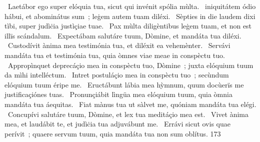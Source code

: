 {~Laetábor ego super elóquia tua, sicut qui invénit spólia mùlta.
~iniquitátem ódio hábui, et abominátus sum~; leġem autem tuam diléxi.
~Sèpties in die laudem dixi tìbi, super judìċia justìçiae tuae.
~Pax mùlta diligèntibus leġem tuam, et non est illïs scándalum.
~Expectábam salutáre tuum, Dòmine, et mandáta tua diléxi.
~Custodívit ànima mea testimónia tua, et diléxit ea vehemènter.
~Servávi mandáta tua et testimónia tua, quia òmnes viae meae in conspèctu tuo.
~Appropìnquet deprecáçio mea in conspèctu tuo, Dòmine~; juxta elóquium tuum da mìhi intelléctum.
~Intret postuláçio mea in conspèctu tuo~; secùndum elóquium tuum éripe me.
~Eructábunt lábia mea hỳmnum, quum docùerïs me justificaçiónes tuas.
~Pronunçiábit lìngüa mea elóquium tuum, quia òmnia mandáta tua áequitas.
~Fiat mànus tua ut sàlvet me, quóniam mandáta tua elégi.
~Concupívi salutáre tuum, Dòmine, et lex tua meditáçio mea est.
~Vivet ànima mea, et laudábit te, et judìċia tua adjuvábunt me.
~Errávi sicut ovis quae perívit~; quaere servum tuum, quia mandáta tua non sum oblítus.}
{17}{3}

